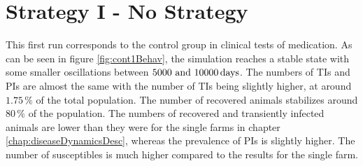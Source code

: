 \section{Strategy I - No Strategy}
This first run corresponds to the control group in clinical tests of medication. As can be seen in figure \ref{fig:cont1Behav}, the simulation reaches a stable state with some smaller oscillations between $5000\text{ and } 10000\,\text{days}$. The numbers of TIs and PIs are almost the same with the number of TIs being slightly higher, at around $1.75\,\%$ of the total population. The number of recovered animals stabilizes around $80\,\%$ of the population. The numbers of recovered and transiently infected animals are lower than they were for the single farms in chapter \ref{chap:diseaseDynamicsDesc}, whereas the prevalence of PIs is slightly higher. The number of susceptibles is much higher compared to the results for the single farm. 
